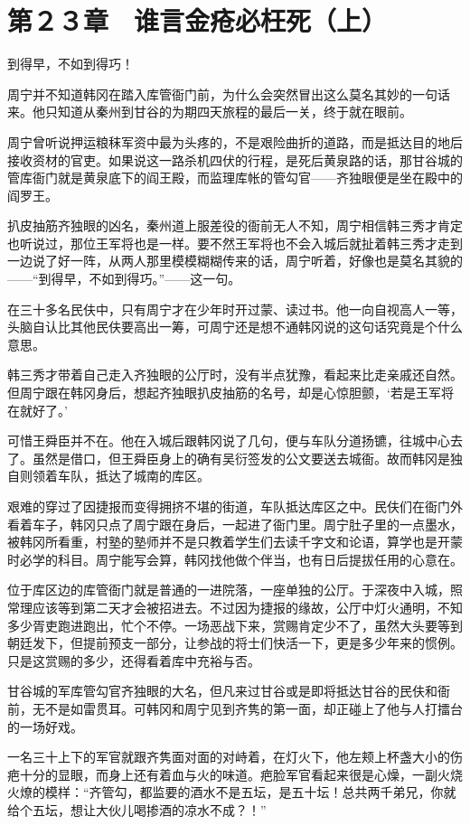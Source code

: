 \section{第２３章　谁言金疮必枉死（上）}

到得早，不如到得巧！

周宁并不知道韩冈在踏入库管衙门前，为什么会突然冒出这么莫名其妙的一句话来。他只知道从秦州到甘谷的为期四天旅程的最后一关，终于就在眼前。

周宁曾听说押运粮秣军资中最为头疼的，不是艰险曲折的道路，而是抵达目的地后接收资材的官吏。如果说这一路杀机四伏的行程，是死后黄泉路的话，那甘谷城的管库衙门就是黄泉底下的阎王殿，而监理库帐的管勾官——齐独眼便是坐在殿中的阎罗王。

扒皮抽筋齐独眼的凶名，秦州道上服差役的衙前无人不知，周宁相信韩三秀才肯定也听说过，那位王军将也是一样。要不然王军将也不会入城后就扯着韩三秀才走到一边说了好一阵，从两人那里模模糊糊传来的话，周宁听着，好像也是莫名其貌的——“到得早，不如到得巧。”——这一句。

在三十多名民伕中，只有周宁才在少年时开过蒙、读过书。他一向自视高人一等，头脑自认比其他民伕要高出一筹，可周宁还是想不通韩冈说的这句话究竟是个什么意思。

韩三秀才带着自己走入齐独眼的公厅时，没有半点犹豫，看起来比走亲戚还自然。但周宁跟在韩冈身后，想起齐独眼扒皮抽筋的名号，却是心惊胆颤，‘若是王军将在就好了。’

可惜王舜臣并不在。他在入城后跟韩冈说了几句，便与车队分道扬镳，往城中心去了。虽然是借口，但王舜臣身上的确有吴衍签发的公文要送去城衙。故而韩冈是独自则领着车队，抵达了城南的库区。

艰难的穿过了因捷报而变得拥挤不堪的街道，车队抵达库区之中。民伕们在衙门外看着车子，韩冈只点了周宁跟在身后，一起进了衙门里。周宁肚子里的一点墨水，被韩冈所看重，村塾的塾师并不是只教着学生们去读千字文和论语，算学也是开蒙时必学的科目。周宁能写会算，韩冈找他做个伴当，也有日后提拔任用的心意在。

位于库区边的库管衙门就是普通的一进院落，一座单独的公厅。于深夜中入城，照常理应该等到第二天才会被招进去。不过因为捷报的缘故，公厅中灯火通明，不知多少胥吏跑进跑出，忙个不停。一场恶战下来，赏赐肯定少不了，虽然大头要等到朝廷发下，但提前预支一部分，让参战的将士们快活一下，更是多少年来的惯例。只是这赏赐的多少，还得看着库中充裕与否。

甘谷城的军库管勾官齐独眼的大名，但凡来过甘谷或是即将抵达甘谷的民伕和衙前，无不是如雷贯耳。可韩冈和周宁见到齐隽的第一面，却正碰上了他与人打擂台的一场好戏。

一名三十上下的军官就跟齐隽面对面的对峙着，在灯火下，他左颊上杯盏大小的伤疤十分的显眼，而身上还有着血与火的味道。疤脸军官看起来很是心燥，一副火烧火燎的模样：“齐管勾，都监要的酒水不是五坛，是五十坛！总共两千弟兄，你就给个五坛，想让大伙儿喝掺酒的凉水不成？！”

